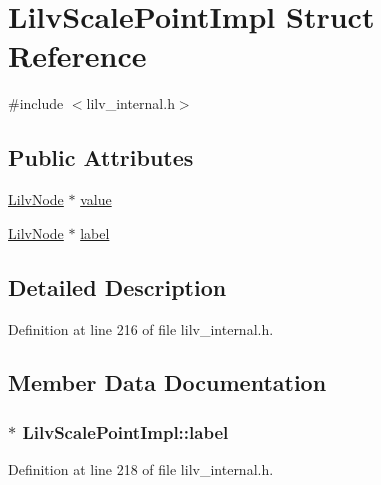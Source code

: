 \hypertarget{struct_lilv_scale_point_impl}{}\section{Lilv\+Scale\+Point\+Impl Struct Reference}
\label{struct_lilv_scale_point_impl}


{\ttfamily \#include $<$lilv\+\_\+internal.\+h$>$}

\subsection*{Public Attributes}
\begin{DoxyCompactItemize}
\item 
\hyperlink{lilv_8h_ae183dca3dca5368d34dbd863a405437b}{Lilv\+Node} $\ast$ \hyperlink{struct_lilv_scale_point_impl_ad35e6b3c176a538a376cfce7b88ac5d1}{value}
\item 
\hyperlink{lilv_8h_ae183dca3dca5368d34dbd863a405437b}{Lilv\+Node} $\ast$ \hyperlink{struct_lilv_scale_point_impl_a87590b4fdfa3e0badd9ddd67c808578a}{label}
\end{DoxyCompactItemize}


\subsection{Detailed Description}


Definition at line 216 of file lilv\+\_\+internal.\+h.



\subsection{Member Data Documentation}
\subsubsection[{\texorpdfstring{label}{label}}]{$\ast$ Lilv\+Scale\+Point\+Impl\+::label}\hypertarget{struct_lilv_scale_point_impl_a87590b4fdfa3e0badd9ddd67c808578a}{}\label{struct_lilv_scale_point_impl_a87590b4fdfa3e0badd9ddd67c808578a}


Definition at line 218 of file lilv\+\_\+internal.\+h.

